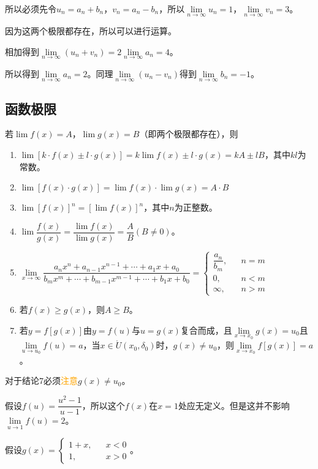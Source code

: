 \documentclass[UTF8, 12pt]{ctexart}
\begin{document}
所以必须先令$u_n=a_n+b_n$，$v_n=a_n-b_n$，所以$\lim\limits_{n\to\infty}u_n=1$，$\lim\limits_{n\to\infty}v_n=3$。

因为这两个极限都存在，所以可以进行运算。

相加得到$\lim\limits_{n\to\infty}(u_n+v_n)=2\lim\limits_{n\to\infty}a_n=4$。

所以得到$\lim\limits_{n\to\infty}a_n=2$。同理$\lim\limits_{n\to\infty}(u_n-v_n)$得到$\lim\limits_{n\to\infty}b_n=-1$。

\subsection{函数极限}

若$\lim f(x)=A$，$\lim g(x)=B$（即两个极限都存在），则

\begin{enumerate}
    \item $\lim[k\cdot f(x)\pm l\cdot g(x)]=k\lim f(x)\pm l\cdot g(x)=kA\pm lB$，其中$kl$为常数。
    \item $\lim[f(x)\cdot g(x)]=\lim f(x)\cdot\lim g(x)=A\cdot B$
    \item $\lim[f(x)]^n=[\lim f(x)]^n$，其中$n$为正整数。
    \item $\lim\dfrac{f(x)}{g(x)}=\dfrac{\lim f(x)}{\lim g(x)}=\dfrac{A}{B}(B\neq 0)$。
    \item $\lim\limits_{x\to\infty}\dfrac{a_nx^n+a_{n-1}x^{n-1}+\cdots+a_1x+a_0}{b_mx^m+\cdots+b_{m-1}x^{m-1}+\cdots+b_1x+b_0}=\left\{
        \begin{array}{lcl}
            \dfrac{a_n}{b_m}, & & n=m \\
            0, & & n<m \\
            \infty, & & n>m
        \end{array}
    \right.$
    \item 若$f(x)\geqslant g(x)$，则$A\geqslant B$。
    \item 若$y=f[g(x)]$由$y=f(u)$与$u=g(x)$复合而成，且$\lim\limits_{x\to x_0}g(x)=u_0$且$\lim\limits_{u\to u_0}f(u)=a$，当$x\in\mathring{U}(x_0,\delta_0)$时，$g(x)\neq u_0$，则$\lim\limits_{x\to x_0}f[g(x)]=a$。 
\end{enumerate}

对于结论7必须\textcolor{orange}{注意}$g(x)\neq u_0$。

假设$f(u)=\dfrac{u^2-1}{u-1}$，所以这个$f(x)$在$x=1$处应无定义。但是这并不影响$\lim\limits_{u\to 1}f(u)=2$。

假设$g(x)=\left\{
    \begin{array}{lcl}
        1+x, & & x<0 \\
        1, & & x>0
    \end{array}
\right.$。
\end{document}
